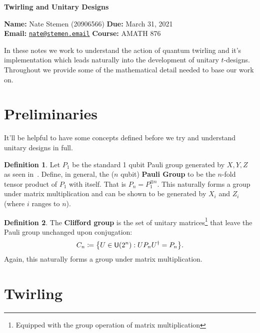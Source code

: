 \documentclass[11pt,english]{article}
\theoremstyle{definition}
\newtheorem{definition}{Definition}[section]
\begin{document}
\thispagestyle{empty}
\begin{center}
  \textsf{\textbf{\LARGE Twirling and Unitary Designs}}
\end{center}
\textbf{Name:} Nate Stemen (20906566) \hspace{\fill} \textbf{Due:} March 31, 2021 \\
\textbf{Email:} \href{mailto:nate@stemen.email}{\texttt{nate@stemen.email}} \hspace{\fill} \textbf{Course:} \textsc{AMATH} 876


\begingroup
{}
\hypersetup{linkcolor=darkblue}
\tableofcontents
\endgroup

\vspace{0.5cm}

In these notes we work to understand the action of quantum twirling and it's implementation which leads naturally into the development of unitary $t$-designs.
Throughout we provide some of the mathematical detail needed to base our work on.

\section{Preliminaries}
It'll be helpful to have some concepts defined before we try and understand unitary designs in full.

\begin{definition}
  Let $P_1$ be the standard 1 qubit Pauli group generated by $X, Y, Z$ as seen in~\cite{lecture}.
  Define, in general, the ($n$ qubit) \textbf{Pauli Group} to be the $n$-fold tensor product of $P_1$ with itself.
  That is $P_n = P_1^{\otimes n}$.
  This naturally forms a group under matrix multiplication and can be shown to be generated by $X_i$ and $Z_i$ (where $i$ ranges to $n$).
\end{definition}

\begin{definition}\label{def:cliffords}
  The \textbf{Clifford group} is the set of unitary matrices\footnote{Equipped with the group operation of matrix multiplication} that leave the Pauli group unchanged upon conjugation:
  \begin{equation}
    C_n\coloneqq \qty{U\in\mathsf{U}(2^n) : UP_n U^\dagger = P_n}.
  \end{equation}
  Again, this naturally forms a group under matrix multiplication.
\end{definition}

\section{Twirling}
\end{document}
